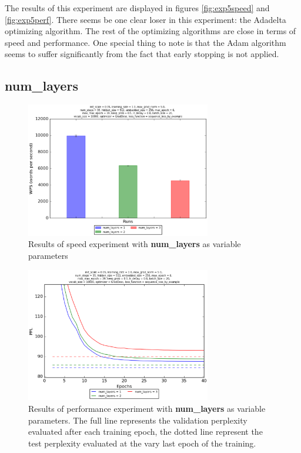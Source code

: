 \documentclass[10pt,a4paper,titlepage]{article}
\begin{document}
The results of this experiment are displayed in figures \ref{fig:exp5speed} and \ref{fig:exp5perf}. There seems be one clear loser in this experiment: the Adadelta optimizing algorithm. The rest of the optimizing algorithms are close in terms of speed and performance. One special thing to note is that the Adam algorithm seems to suffer significantly from the fact that early stopping is not applied.

\subsection{num\_layers}

\begin{figure}[H]
	\begin{center}
		\includegraphics[width=0.72\textwidth]{layersspeed.eps}
		\caption{Results of speed experiment with \textbf{num\_layers} as variable parameters}
		\label{fig:exp6speed}
	\end{center}	
\end{figure}

\begin{figure}[H]
	\begin{center}
		\includegraphics[width=0.72\textwidth]{layersperf.eps}
		\caption{Results of performance experiment with \textbf{num\_layers} as variable parameters. The full line represents the validation perplexity evaluated after each training epoch, the dotted line represent the test perplexity evaluated at the vary last epoch of the training.}
		\label{fig:exp6perf}
	\end{center}	
\end{figure}
\end{document}
